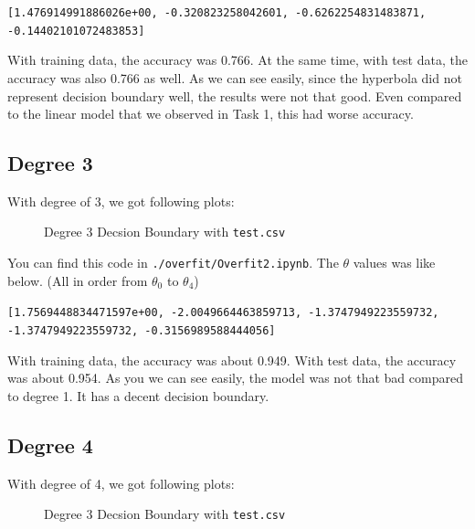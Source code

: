 \documentclass{homework}
\begin{document}
\begin{center}
\texttt{[1.476914991886026e+00, -0.320823258042601, -0.6262254831483871, -0.14402101072483853]}
\end{center}

With training data, the accuracy was 0.766. At the same time, with test data, the accuracy was also 0.766 as well. As we can see easily, since the hyperbola did not represent decision boundary well, the results were not that good. Even compared to the linear model that we observed in Task 1, this had worse accuracy.

\subsection{Degree 3}
With degree of 3, we got following plots:

\begin{figure}[h]
    \begin{center}
        \resizebox{0.5\textwidth}{!}{}
    \end{center}
    \caption{Degree 3 Decsion Boundary with \texttt{test.csv}}
\end{figure}

You can find this code in \texttt{./overfit/Overfit2.ipynb}. The $\theta$ values was like below. (All in order from $\theta_0$ to $\theta_4$)

\begin{center}
\texttt{[1.7569448834471597e+00, -2.0049664463859713, -1.3747949223559732, -1.3747949223559732, -0.3156989588444056]}
\end{center}

With training data, the accuracy was about 0.949. With test data, the accuracy was about 0.954. As you we can see easily, the model was not that bad compared to degree 1. It has a decent decision boundary.

\subsection{Degree 4}
With degree of 4, we got following plots:

\begin{figure}[h]
    \begin{center}
        \resizebox{0.5\textwidth}{!}{}
    \end{center}
    \caption{Degree 3 Decsion Boundary with \texttt{test.csv}}
\end{figure}
\end{document}
